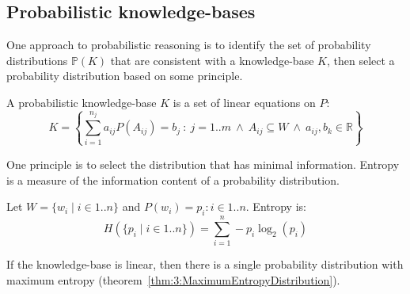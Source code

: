 \subsection{Probabilistic knowledge-bases}

One approach to probabilistic reasoning is to identify the set of probability
distributions $\mathbb{P}(K)$ that are consistent with a knowledge-base $K$,
then select a probability distribution based on some principle.

\begin{dfn}
  A probabilistic knowledge-base $K$ is a set of linear equations on $P$:
  \begin{equation}
    K = \left\{ \sum_{i = 1}^{n_j}a_{ij} P(A_{ij}) = b_j \ :\ j = 1 .. m \ \land \
    A_{ij}\subseteq W \ \land \ a_{ij},b_k \in\mathbb{R} \right\}
  \end{equation}
\end{dfn}

One principle is to select the distribution that
has minimal information.
Entropy is a measure of the information content of a probability distribution.

\begin{dfn}[Entropy]
  Let $W = \{w_i \mid i \in 1 .. n\}$ and $P(w_i) = p_i : i \in 1 .. n$.
  Entropy is:
  \begin{equation}
    H(\{p_i \mid i \in 1 .. n\}) = \sum_{i = 1}^{n} - p_i \log_2(p_i)
  \end{equation}
\end{dfn}

If the knowledge-base is linear,
then there is a single probability distribution with maximum entropy
(theorem~\ref{thm:3:MaximumEntropyDistribution}).

